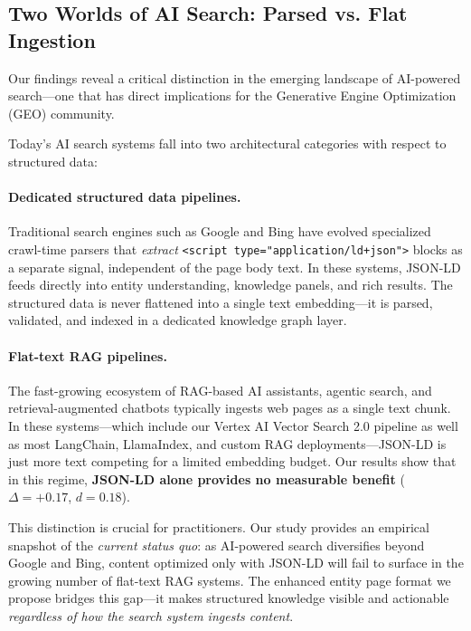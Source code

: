 \documentclass[runningheads]{llncs}
\begin{document}
\subsection{Two Worlds of AI Search: Parsed vs. Flat Ingestion}

Our findings reveal a critical distinction in the emerging landscape
of AI-powered search---one that has direct implications for the
Generative Engine Optimization (GEO) community.

Today's AI search systems fall into two architectural categories with
respect to structured data:

\paragraph{Dedicated structured data pipelines.}
Traditional search engines such as Google and Bing have evolved
specialized crawl-time parsers that \emph{extract}
\texttt{\textless script type="application/ld+json"\textgreater} blocks
as a separate signal, independent of the page body text. In these
systems, JSON-LD feeds directly into entity understanding, knowledge
panels, and rich results. The structured data is never flattened into
a single text embedding---it is parsed, validated, and indexed in a
dedicated knowledge graph layer.

\paragraph{Flat-text RAG pipelines.}
The fast-growing ecosystem of RAG-based AI assistants, agentic search,
and retrieval-augmented chatbots typically ingests web pages as a
single text chunk. In these systems---which include our Vertex AI
Vector Search 2.0 pipeline as well as most LangChain, LlamaIndex,
and custom RAG deployments---JSON-LD is just more text competing for
a limited embedding budget. Our results show that in this regime,
\textbf{JSON-LD alone provides no measurable benefit} ($\Delta = +0.17$,
$d = 0.18$).

\medskip

This distinction is crucial for practitioners. Our study provides
an empirical snapshot of the \emph{current status quo}: as AI-powered
search diversifies beyond Google and Bing, content optimized only with
JSON-LD will fail to surface in the growing number of flat-text RAG
systems. The enhanced entity page format we propose bridges this gap---it
makes structured knowledge visible and actionable
\emph{regardless of how the search system ingests content}.
\end{document}
